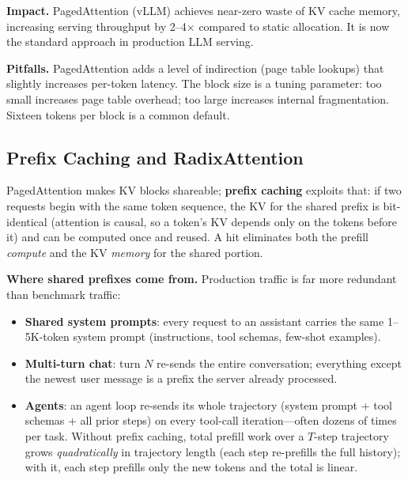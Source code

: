 \textbf{Impact.} PagedAttention (vLLM) achieves near-zero waste of KV cache memory, increasing serving throughput by 2--4$\times$ compared to static allocation. It is now the standard approach in production LLM serving.

\textbf{Pitfalls.} PagedAttention adds a level of indirection (page table lookups) that slightly increases per-token latency. The block size is a tuning parameter: too small increases page table overhead; too large increases internal fragmentation. Sixteen tokens per block is a common default.

\subsection{Prefix Caching and RadixAttention}
\label{sec:prefix_caching}

PagedAttention makes KV blocks shareable; \textbf{prefix caching} exploits that: if two requests begin with the same token sequence, the KV for the shared prefix is bit-identical (attention is causal, so a token's KV depends only on the tokens before it) and can be computed once and reused. A hit eliminates both the prefill \textit{compute} and the KV \textit{memory} for the shared portion.

\textbf{Where shared prefixes come from.} Production traffic is far more redundant than benchmark traffic:
\begin{itemize}
    \item \textbf{Shared system prompts}: every request to an assistant carries the same 1--5K-token system prompt (instructions, tool schemas, few-shot examples).
    \item \textbf{Multi-turn chat}: turn $N$ re-sends the entire conversation; everything except the newest user message is a prefix the server already processed.
    \item \textbf{Agents}: an agent loop re-sends its whole trajectory (system prompt + tool schemas + all prior steps) on every tool-call iteration---often dozens of times per task. Without prefix caching, total prefill work over a $T$-step trajectory grows \textit{quadratically} in trajectory length (each step re-prefills the full history); with it, each step prefills only the new tokens and the total is linear.
\end{itemize}

